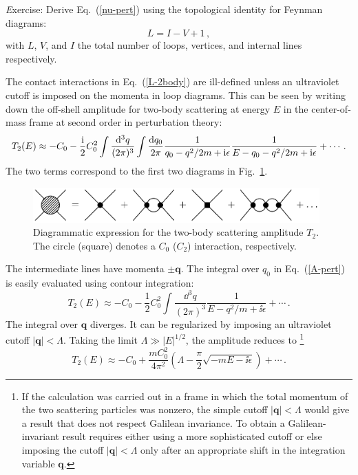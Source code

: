 \begin{prob}
{\emph Exercise:}  Derive Eq.~(\ref{nu-pert}) using the topological
identity for Feynman diagrams:
\begin{equation}
 L=I-V+1\,,
\end{equation}
with $L$, $V$, and $I$ the total number of loops, vertices, and internal lines
respectively. 
\end{prob}

The contact interactions in Eq.~(\ref{L-2body}) are ill-defined unless an
ultraviolet cutoff is imposed on the momenta in loop diagrams.
This can be seen by writing down the off-shell amplitude for two-body
scattering at energy $E$ in the center-of-mass frame at second order in 
perturbation theory:
\begin{equation}
 T_2 (E) \approx {-}C_0 - \frac\ii2
 C_0^2 \int \frac{\dd^3q}{(2 \pi)^3}
 \int\frac{\dd q_0}{2 \pi} \frac1{q_0 - q^2 /2m + \ii \epsilon}
 \frac1{E - q_0 - q^2 /2m + \ii\epsilon} + \cdots \,.
\nonumber\\
\label{A-pert}
\end{equation}
The two terms correspond to the first two diagrams in 
Fig.~\ref{fig:amp2}. 
\begin{figure}[htb]
\bigskip
\centerline{\includegraphics*[width=11cm,angle=0]{fig_2bdypert.pdf}}
\medskip
\caption
{Diagrammatic expression for the two-body scattering amplitude $T_2$.
The circle (square) denotes a $C_0$ ($C_2$) interaction, respectively.}
\label{fig:amp2}
\end{figure}
The intermediate lines have momenta $\pm {\bm q}$.
The integral over $q_0$ in Eq.~(\ref{A-pert}) is easily
evaluated using contour integration:
\begin{equation}
 T_2 (E) \approx {-}C_0 - \frac12 C_0^2 
 \int \frac{\dd^3q}{(2 \pi)^3} \frac1{E - q^2/m +\ii \epsilon} + \cdots \,.
\end{equation}
The integral over ${\bm q}$ diverges. It can be regularized by imposing
an ultraviolet
cutoff $|{\bm q}| < \Lambda$. Taking the limit $\Lambda \gg |E|^{1/2}$,
the amplitude reduces to \footnote{
If the calculation was carried out in a
frame in which the total momentum of the two scattering particles was
nonzero, the simple cutoff $|{\bm q}| < \Lambda$ would give a result that does
not respect Galilean invariance. To obtain a Galilean-invariant result 
requires either using a more sophisticated cutoff or else imposing
the cutoff $|{\bm q}| < \Lambda$ only after an
appropriate shift in the integration variable ${\bm q}$.}
\begin{equation}
 T_2 (E) \approx - C_0 + \frac{mC_0^2}{4 \pi^2} 
 \left(\Lambda - \frac{\pi}{2} \sqrt {-mE -\ii \epsilon} \right) + \cdots \,.
\label{amp2-2nd}
\end{equation}

